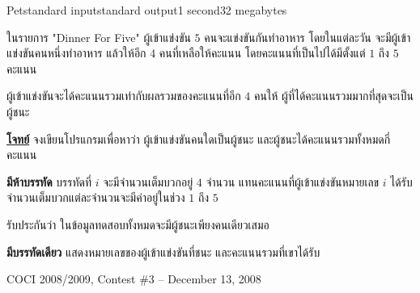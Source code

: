 \documentclass[11pt,a4paper]{article}
\begin{document}
\begin{problem}{Pet}{standard input}{standard output}{1 second}{32 megabytes}

ในรายการ "Dinner For Five" ผู้เข้าแข่งขัน $5$ คนจะแข่งขันกันทำอาหาร โดยในแต่ละวัน จะมีผู้เข้าแข่งขันคนหนึ่งทำอาหาร แล้วให้อีก $4$ คนที่เหลือให้คะแนน โดยคะแนนที่เป็นไปได้มีตั้งแต่ $1$ ถึง $5$ คะแนน

ผู้เข้าแข่งขันจะได้คะแนนรวมเท่ากับผลรวมของคะแนนที่อีก $4$ คนให้ ผู้ที่ได้คะแนนรวมมากที่สุดจะเป็นผู้ชนะ

\underline{\textbf{โจทย์}} จงเขียนโปรแกรมเพื่อหาว่า ผู้เข้าแข่งขันคนใดเป็นผู้ชนะ และผู้ชนะได้คะแนนรวมทั้งหมดกี่คะแนน

\InputFile

\textbf{มีห้าบรรทัด} บรรทัดที่ $i$ จะมีจำนวนเต็มบวกอยู่ $4$ จำนวน แทนคะแนนที่ผู้เข้าแข่งขันหมายเลข $i$ ได้รับ จำนวนเต็มบวกแต่ละจำนวนจะมีค่าอยู่ในช่วง $1$ ถึง $5$

รับประกันว่า ในข้อมูลทดสอบทั้งหมดจะมีผู้ชนะเพียงคนเดียวเสมอ

\OutputFile

\textbf{มีบรรทัดเดียว} แสดงหมายเลขของผู้เข้าแข่งขันที่ชนะ และคะแนนรวมที่เขาได้รับ

\Examples

\begin{example}
%
%
\end{example}


\Source

COCI 2008/2009, Contest \#3 – December 13, 2008



\end{problem}
\end{document}
